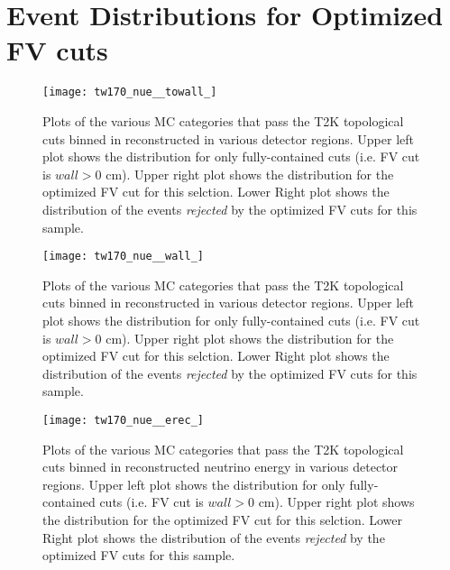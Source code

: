\section{Event Distributions for Optimized FV cuts}
\label{sec:evtdist}


\begin{figure}[h]
  \begin{center}
    \texttt{[image: tw170\_nue\_\_towall\_]}
  \end{center}
  \caption{Plots of the various MC categories that pass the T2K \nue
  topological cuts binned in reconstructed \towall in various detector regions. Upper left
  plot shows the distribution for only fully-contained cuts (i.e. FV cut is \@ $wall > 0$ cm).
  Upper right plot shows the distribution for the optimized FV cut for this selction.
  Lower Right plot shows the distribution of the events \emph{rejected} by the optimized
  FV cuts for this sample.
  }
  \label{fig:compnuetowall}
\end{figure}


\begin{figure}[h]
  \begin{center}
    \texttt{[image: tw170\_nue\_\_wall\_]}
  \end{center}
  \caption{Plots of the various MC categories that pass the T2K \nue
  topological cuts binned in reconstructed \wall in various detector regions. Upper left
  plot shows the distribution for only fully-contained cuts (i.e. FV cut is \@ $wall > 0$ cm).
  Upper right plot shows the distribution for the optimized FV cut for this selction.
  Lower Right plot shows the distribution of the events \emph{rejected} by the optimized
  FV cuts for this sample.
  }
  \label{fig:compnuewall}
\end{figure}


\begin{figure}[h]
  \begin{center}
    \texttt{[image: tw170\_nue\_\_erec\_]}
  \end{center}
  \caption{Plots of the various MC categories that pass the T2K \nue
  topological cuts binned in reconstructed neutrino energy in various detector
  regions. Upper left plot shows the distribution for only fully-contained cuts
  (i.e. FV cut is \@ $wall > 0$ cm).  Upper right plot shows the distribution
  for the optimized FV cut for this selction.  Lower Right plot shows the
  distribution of the events \emph{rejected} by the optimized FV cuts for this
  sample.
  }
  \label{fig:compnueerec}
\end{figure}

